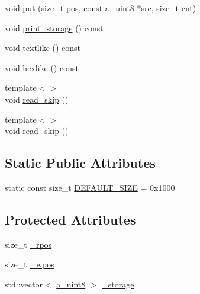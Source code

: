 \begin{DoxyCompactItemize}
\item 
void \hyperlink{class_agmd_network_1_1_byte_buffer_ab05873768789da3e3421e2317bd27c80}{put} (size\+\_\+t \hyperlink{_examples_2_planet_2_app_8cpp_aa8a1c0491559faca4ebd0881575ae7f0}{pos}, const \hyperlink{_common_defines_8h_afbe6c09973474a1f78f870f39073398f}{a\+\_\+uint8} $\ast$src, size\+\_\+t cnt)
\item 
void \hyperlink{class_agmd_network_1_1_byte_buffer_a9dd8a0b37247ae12cd6c1375bad55266}{print\+\_\+storage} () const 
\item 
void \hyperlink{class_agmd_network_1_1_byte_buffer_a7d8ab902ddcb4d13428ddb557da91e67}{textlike} () const 
\item 
void \hyperlink{class_agmd_network_1_1_byte_buffer_a1aa14bb23bfaf057445f1bede2a461d1}{hexlike} () const 
\item 
{\footnotesize template$<$$>$ }\\void \hyperlink{class_agmd_network_1_1_byte_buffer_af6e3d08537d2716cfba1c9dcd2d73450}{read\+\_\+skip} ()
\item 
{\footnotesize template$<$$>$ }\\void \hyperlink{class_agmd_network_1_1_byte_buffer_af6e3d08537d2716cfba1c9dcd2d73450}{read\+\_\+skip} ()
\end{DoxyCompactItemize}
\subsection*{Static Public Attributes}
\begin{DoxyCompactItemize}
\item 
static const size\+\_\+t \hyperlink{class_agmd_network_1_1_byte_buffer_a152263f475290fe24839a64ef4d2b0d4}{D\+E\+F\+A\+U\+L\+T\+\_\+\+S\+I\+Z\+E} = 0x1000
\end{DoxyCompactItemize}
\subsection*{Protected Attributes}
\begin{DoxyCompactItemize}
\item 
size\+\_\+t \hyperlink{class_agmd_network_1_1_byte_buffer_af3874e3f81641a76da487879b5d861a9}{\+\_\+rpos}
\item 
size\+\_\+t \hyperlink{class_agmd_network_1_1_byte_buffer_ad5b87e7a5fe12a9e0499c65082b21208}{\+\_\+wpos}
\item 
std\+::vector$<$ \hyperlink{_common_defines_8h_afbe6c09973474a1f78f870f39073398f}{a\+\_\+uint8} $>$ \hyperlink{class_agmd_network_1_1_byte_buffer_a72541e039bd7f1b0573b2a1af04e4d4c}{\+\_\+storage}
\end{DoxyCompactItemize}



